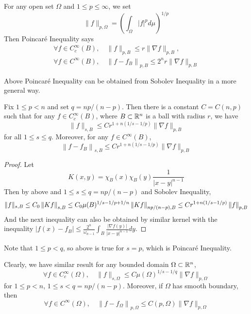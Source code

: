 \noindent For any open set $\Omega$ and $1 \leq p \leq \infty$, we set
\begin{equation*}
	\|f\|_{p, \Omega}=\left(\int_{\Omega}|f|^p d \mu\right)^{1 / p}
\end{equation*}
Then Poincar\'e Inequality says
\begin{equation*}
	\begin{gathered}
		\forall f \in C_c^{\infty}(B), \quad\|f\|_{p, B} \leq r\|\nabla f\|_{p, B}, \\
		\forall f \in C^{\infty}(B), \quad\left\|f-f_B\right\|_{p, B} \leq 2^n r\|\nabla f\|_{p, B}
	\end{gathered}
\end{equation*}

\noindent Above Poincar\'e Inequality can be obtained from Sobolev Inequality in a more general way.
\begin{thm}\label{thm:genepoincare}
	Fix $1 \leq p < n$ and set $q = np / (n-p)$. Then there is a constant $C = C(n,p)$ such that for any $f \in C_c^\infty(B)$, where $B \subset \mathbb{R}^n$ is a ball with radius $r$, we have
	\begin{equation*}
		\|f\|_{s, B} \leq C r^{1+n(1 / s-1 / p)}\|\nabla f\|_{p, B}
	\end{equation*}
	for all $1 \leq s \leq q$. Moreover, for any $f \in C^\infty(B)$,
	\begin{equation*}
		\left\|f-f_B\right\|_{s, B} \leq C r^{1+n(1 / s-1 / p)}\|\nabla f\|_{p, B}
	\end{equation*}
\end{thm}
\begin{proof}
	Let
	\begin{equation*}
		K(x, y)=\chi_{B}(x) \chi_{B}(y) \frac{1}{|x-y|^{n-1}}
	\end{equation*}
	Then by above and $1 \leq s \leq q = np/(n-p)$ and Sobolev Inequality,
	\begin{equation*}
		\|f\|_{s, B} \leq C_0\left\lVert Kf\right\lVert_{s,B} \leq C_0 \mu(B)^{1/s -1/p + 1/n}\left\lVert Kf\right\lVert_{np/(n-p),B} \leq C r^{1 + n(1/s-1/p)}\left\lVert f\right\lVert_{p,B}
	\end{equation*}
	And the next inequality can also be obtained by similar kernel with the inequality $\left|f(x)-f_B\right| \leq \frac{2^n}{\omega_{n-1}} \int_B \frac{|\nabla f(y)|}{|x-y|^{n-1}} d y$.
\end{proof}
Note that $1\leq p < q$, so above is true for $s = p$, which is Poincar\'e Inequality.
\begin{rmk}
	Clearly, we have similar result for any bounded domain $\Omega \subset \mathbb{R}^n$,
	\begin{equation*}
		\forall f \in C_c^{\infty}(\Omega), \quad\|f\|_{s, \Omega} \leq C \mu(\Omega)^{1 / s-1 / q}\|\nabla f\|_{p, \Omega}
	\end{equation*}
	for $1 \leq p < n$, $1 \leq s < q = np/(n-p)$. Moreover, if $\Omega$ has smooth boundary, then
	\begin{equation*}
		\forall f \in C^{\infty}(\Omega), \quad\left\|f-f_{\Omega}\right\|_{p, \Omega} \leq C(p, \Omega)\|\nabla f\|_{p, \Omega}
	\end{equation*}
\end{rmk}

